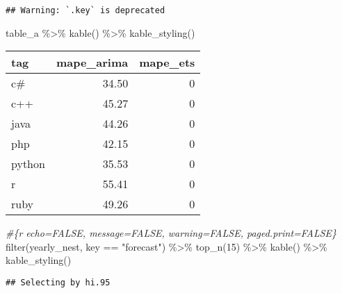 \documentclass[
]{article}
\newenvironment{Shaded}{\begin{snugshade}}{\end{snugshade}}
\newcommand{\CommentTok}[1]{\textcolor[rgb]{0.56,0.35,0.01}{\textit{#1}}}
\newcommand{\DecValTok}[1]{\textcolor[rgb]{0.00,0.00,0.81}{#1}}
\newcommand{\FunctionTok}[1]{\textcolor[rgb]{0.00,0.00,0.00}{#1}}
\newcommand{\NormalTok}[1]{#1}
\newcommand{\SpecialCharTok}[1]{\textcolor[rgb]{0.00,0.00,0.00}{#1}}
\newcommand{\StringTok}[1]{\textcolor[rgb]{0.31,0.60,0.02}{#1}}
\begin{document}
\begin{verbatim}
## Warning: `.key` is deprecated
\end{verbatim}

\begin{Shaded}
\begin{Highlighting}[]
\NormalTok{table\_a }\SpecialCharTok{\%\textgreater{}\%} 
  \FunctionTok{kable}\NormalTok{() }\SpecialCharTok{\%\textgreater{}\%} 
  \FunctionTok{kable\_styling}\NormalTok{()}
\end{Highlighting}
\end{Shaded}

\begin{table}
\centering
\begin{tabular}{l|r|r}
\hline
tag & mape\_arima & mape\_ets\\
\hline
c\# & 34.50 & 0\\
\hline
c++ & 45.27 & 0\\
\hline
java & 44.26 & 0\\
\hline
php & 42.15 & 0\\
\hline
python & 35.53 & 0\\
\hline
r & 55.41 & 0\\
\hline
ruby & 49.26 & 0\\
\hline
\end{tabular}
\end{table}

\begin{Shaded}
\begin{Highlighting}[]
\CommentTok{\#\{r echo=FALSE, message=FALSE, warning=FALSE, paged.print=FALSE\}}
\FunctionTok{filter}\NormalTok{(yearly\_nest, key }\SpecialCharTok{==} \StringTok{"forecast"}\NormalTok{) }\SpecialCharTok{\%\textgreater{}\%}
  \FunctionTok{top\_n}\NormalTok{(}\DecValTok{15}\NormalTok{) }\SpecialCharTok{\%\textgreater{}\%} 
  \FunctionTok{kable}\NormalTok{() }\SpecialCharTok{\%\textgreater{}\%} 
  \FunctionTok{kable\_styling}\NormalTok{()}
\end{Highlighting}
\end{Shaded}

\begin{verbatim}
## Selecting by hi.95
\end{verbatim}
\end{document}

